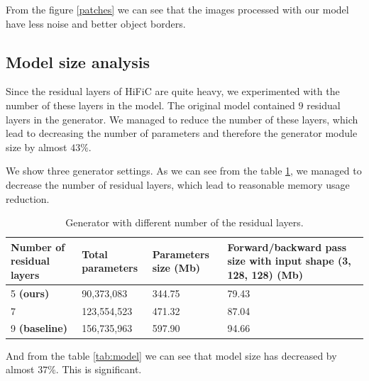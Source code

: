From the figure \ref{patches} we can see that the images processed with our model have less noise and better object borders.

\subsection{Model size analysis}

Since the residual layers of HiFiC \cite{mentzer_high_fidelity_2020} are quite heavy, we experimented with the number of these layers in the model. The original model contained $9$ residual layers in the generator. We managed to reduce the number of these layers, which lead to decreasing the number of parameters and therefore the generator module size by almost $43\%$.

We show three generator settings. As we can see from the table \ref{tab:generator}, we managed to decrease the number of residual layers, which lead to reasonable memory usage reduction.

\begin{table}
    \centering
    \caption{Generator with different number of the residual layers.}
    \label{tab:generator}
    \begin{tabular}{p{3cm}|p{2cm}|p{2cm}|p{4cm}}
        \hline
        \textbf{Number of residual layers} & \textbf{Total parameters} & \textbf{Parameters size (Mb)} & \textbf{Forward/backward pass size with input shape (3, 128, 128) (Mb)} \\
        \hline
        5 \textbf{(ours)}                  & 90,373,083                & 344.75                        & 79.43                                                                   \\
        \hline
        7                                  & 123,554,523               & 471.32                        & 87.04                                                                   \\
        \hline
        9 \textbf{(baseline)}              & 156,735,963               & 597.90                        & 94.66
    \end{tabular}
\end{table}

And from the table \ref{tab:model} we can see that model size has decreased by almost $37\%$. This is significant.

